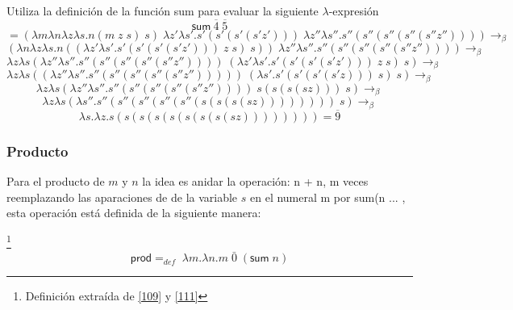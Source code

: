         \begin{exercise}
            Utiliza la definición de la función \textsf{sum} para evaluar la siguiente  $\lambda$-expresión
            \[
                \textsf{sum}\  \overline{4} \; \overline{5} 
            \]
            \[
                = (\lambda m\lambda n\lambda z\lambda s.n(m \; z \; s) \; s) \; \lambda z'\lambda s'.s'(s'(s'(s'z'))) \; \lambda z''\lambda s''.s''(s''(s''(s''(s''z'')))) \rightarrow_\beta 
            \]
            \[
                (\lambda n\lambda z\lambda s.n((\lambda z'\lambda s'.s'(s'(s'(s'z'))) \; z \; s) \; s)) \; \lambda z''\lambda s''.s''(s''(s''(s''(s''z'')))) \rightarrow_\beta 
            \]
            \[
                \lambda z\lambda s(\lambda z''\lambda s''.s''(s''(s''(s''(s''z'')))) \; (\lambda z'\lambda s'.s'(s'(s'(s'z'))) \; z \; s) \; s) \rightarrow_\beta
            \]
            \[
                \lambda z\lambda s((\lambda z''\lambda s''.s''(s''(s''(s''(s''z''))))) \; (\lambda s'.s'(s'(s'(s'z)))  \; s) \; s) \rightarrow_\beta
            \]
            \[
                \lambda z\lambda s(\lambda z''\lambda s''.s''(s''(s''(s''(s''z'')))) \; s(s(s(sz))) \; s) \rightarrow_\beta
            \]
            \[
                \lambda z\lambda s(\lambda s''.s''(s''(s''(s''(s''(s(s(s(sz)))))))) \; s) \rightarrow_\beta
            \]
            \[
                \lambda s.\lambda z .s(s(s(s(s(s(s(s(sz)))))))) = \overline{9}
            \]
        \end{exercise}

        \subsubsection{Producto}
        Para el producto de $m$ y $n$ la idea es anidar la operación: n + n, m veces reemplazando las aparaciones de de la variable $s$ en el numeral m por sum(n ... , esta operación está definida de la siguiente manera:

        \begin{definition}\footnote{Definición extraída de \hyperlink{109}{[109]} y  \hyperlink{111}{[111]}}
            $$\textsf{prod} =_{def}  \; \lambda m.\lambda n.m\; \bar{0} \; (\textsf{sum}\;n)$$
        \end{definition}

